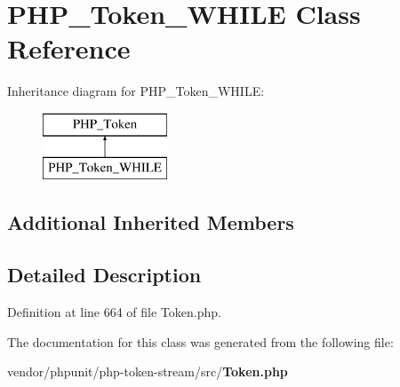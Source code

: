 \section{P\+H\+P\+\_\+\+Token\+\_\+\+W\+H\+I\+L\+E Class Reference}
\label{class_p_h_p___token___w_h_i_l_e}
Inheritance diagram for P\+H\+P\+\_\+\+Token\+\_\+\+W\+H\+I\+L\+E\+:\begin{figure}[H]
\begin{center}
\leavevmode
\includegraphics[height=2.000000cm]{class_p_h_p___token___w_h_i_l_e}
\end{center}
\end{figure}
\subsection*{Additional Inherited Members}


\subsection{Detailed Description}


Definition at line 664 of file Token.\+php.



The documentation for this class was generated from the following file\+:\begin{DoxyCompactItemize}
\item 
vendor/phpunit/php-\/token-\/stream/src/{\bf Token.\+php}\end{DoxyCompactItemize}
